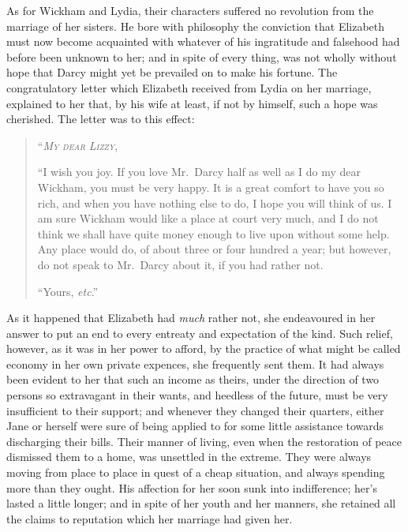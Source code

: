 \documentclass[12pt,english]{book}
\newcommand{\noun}[1]{\textsc{#1}}
\begin{document}
As for Wickham and Lydia, their characters suffered no revolution
from the marriage of her sisters. He bore with philosophy the conviction
that Elizabeth must now become acquainted with whatever of his ingratitude
and falsehood had before been unknown to her; and in spite of every
thing, was not wholly without hope that Darcy might yet be prevailed
on to make his fortune. The congratulatory letter which Elizabeth
received from Lydia on her marriage, explained to her that, by his
wife at least, if not by himself, such a hope was cherished. The letter
was to this effect:

\begin{quotation}
\noindent {}``\textit{\emph{\noun{My}}} \textit{\emph{\noun{dear}}}
\textit{\emph{\noun{Lizzy}}},

{}``I wish you joy. If you love Mr.\ Darcy half as well as I do
my dear Wickham, you must be very happy. It is a great comfort to
have you so rich, and when you have nothing else to do, I hope you
will think of us. I am sure Wickham would like a place at court very
much, and I do not think we shall have quite money enough to live
upon without some help. Any place would do, of about three or four
hundred a year; but however, do not speak to Mr.\ Darcy about it,
if you had rather not.

``Yours, \textit{etc}.'' 
\end{quotation}
As it happened that Elizabeth had \textit{much} rather not, she endeavoured
in her answer to put an end to every entreaty and expectation of the
kind. Such relief, however, as it was in her power to afford, by the
practice of what might be called economy in her own private expences,
she frequently sent them. It had always been evident to her that such
an income as theirs, under the direction of two persons so extravagant
in their wants, and heedless of the future, must be very insufficient
to their support; and whenever they changed their quarters, either
Jane or herself were sure of being applied to for some little assistance
towards discharging their bills. Their manner of living, even when
the restoration of peace dismissed them to a home, was unsettled in
the extreme. They were always moving from place to place in quest
of a cheap situation, and always spending more than they ought. His
affection for her soon sunk into indifference; her's lasted a little
longer; and in spite of her youth and her manners, she retained all
the claims to reputation which her marriage had given her.
\end{document}
